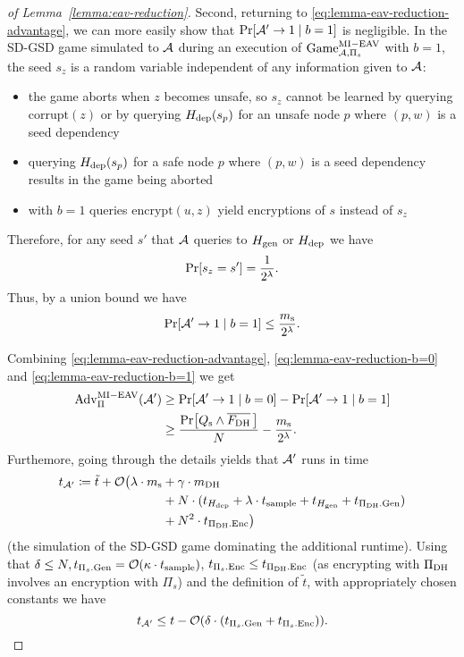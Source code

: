 \begin{proof}[of Lemma~\ref{lemma:eav-reduction}]
	Second, returning to \eqref{eq:lemma-eav-reduction-advantage}, we can more easily show that $\pr{\adv' \to 1 \mid b = 1}$ is negligible. In the SD-GSD game simulated to $\mathcal{A}$ during an execution of $\mathrm{Game}_{\mathcal{A}, \Pi_s}^{\mathrm{MI-EAV}}$ with $b = 1$, the seed $s_z$ is a random variable independent of any information given to $\mathcal{A}$:
	\begin{itemize}
		\item the game aborts when $z$ becomes unsafe, so $s_z$ cannot be learned by querying $\mathrm{corrupt}(z)$ or by querying $H_\mathrm{dep}(s_p)$ for an unsafe node $p$ where $(p, w)$ is a seed dependency
		\item querying $H_\mathrm{dep}(s_p)$ for a safe node $p$ where $(p, w)$ is a seed dependency results in the game being aborted
		\item with $b = 1$ queries $\mathrm{encrypt}(u, z)$ yield encryptions of $s$ instead of $s_z$
	\end{itemize}
	Therefore, for any seed $s'$ that $\mathcal{A}$ queries to $H_\mathrm{gen}$ or $H_\mathrm{dep}$ we have
	\[
		\pr{s_z = s'} = \frac{1}{2^\lambda}.
	\]
	Thus, by a union bound we have
	\begin{equation} \label{eq:lemma-eav-reduction-b=1}
		\pr{\adv' \to 1 \mid b = 1} \le \frac{\ms}{2^\lambda}.
	\end{equation}

	Combining \eqref{eq:lemma-eav-reduction-advantage}, \eqref{eq:lemma-eav-reduction-b=0} and \eqref{eq:lemma-eav-reduction-b=1} we get
	\begin{align} \label{eq:lemma-eav-reduction-advantage-lower-bound}
		\begin{split}
			\mathrm{Adv}_{\Pi}^{\mathrm{MI-EAV}}(\adv') & \ge \pr{\adv' \to 1 \mid b = 0} - \pr{\adv' \to 1 \mid b = 1}           \\
			& \ge \frac{\pr{\qs \land \overline{\fdh}\,}}{N} - \frac{\ms}{2^\lambda}.
		\end{split}
	\end{align}
	Furthemore, going through the details yields that $\mathcal{A}'$ runs in time
	\begin{align*}
		\begin{split}
			t_{\mathcal{A}'} \coloneqq \tilde{t} + \mathcal{O}\big(\lambda \cdot m_\mathrm{s} & +  \gamma \cdot m_\mathrm{DH}  \\
			& + N \cdot (t_{H_\mathrm{dep}} + \lambda \cdot t_{\mathrm{sample}} + t_{H_\mathrm{gen}} + t_{\Pi_{\mathrm{DH}}.\mathrm{Gen}})  \\
			& +  N^2 \cdot t_{\Pi_{\mathrm{DH}}.\mathrm{Enc}}\big)
		\end{split}
	\end{align*}
	(the simulation of the SD-GSD game dominating the additional runtime).
	Using that $\delta \le N, t_{\Pi_s.\mathrm{Gen}} = \mathcal{O}(\kappa \cdot t_{\mathrm{sample}})$, $t_{\Pi_s.\mathrm{Enc}} \le t_{\Pi_{\mathrm{DH}}.\mathrm{Enc}}$ (as encrypting with $\Pi_{\mathrm{DH}}$ involves an encryption with $\Pi_s$) and the definition of $\tilde{t}$, with appropriately chosen constants we have
	\[
		t_{\mathcal{A}'} \le t - \mathcal{O}(\delta \cdot (t_{\Pi_s.\mathrm{Gen}} + t_{\Pi_s.\mathrm{Enc}})).
	\]


\end{proof}
